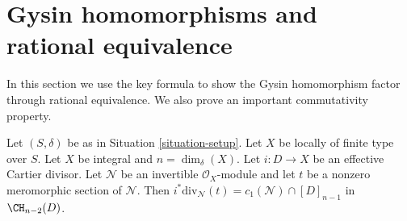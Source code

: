 \section{Gysin homomorphisms and rational equivalence}
\label{section-gysin}

\noindent
In this section we use the key formula to show the Gysin homomorphism
factor through rational equivalence. We also prove an important
commutativity property.

\begin{lemma}
\label{lemma-gysin-factors-general}
Let $(S, \delta)$ be as in Situation \ref{situation-setup}.
Let $X$ be locally of finite type over $S$.
Let $X$ be integral and $n = \dim_\delta(X)$.
Let $i : D \to X$ be an effective Cartier divisor.
Let $\mathcal{N}$ be an invertible $\mathcal{O}_X$-module
and let $t$ be a nonzero meromorphic section of $\mathcal{N}$.
Then $i^*\text{div}_\mathcal{N}(t) = c_1(\mathcal{N}) \cap [D]_{n - 1}$
in $\CH_{n - 2}(D)$.
\end{lemma}

